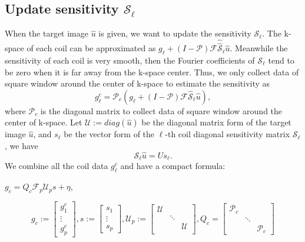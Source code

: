 \documentclass[preprint]{elsarticle}
\begin{document}
\subsection{Update sensitivity $\mathcal{S}_{\ell}$}
When the target image $\hat{u}$ is given, we want to update the sensitivity $\mathcal{S}_{\ell}$.
The k-space of each coil can be approximated as $ g_{\ell} + (I- \mathcal{P}) \mathcal{F}\mathcal{\hat{\hat{S}}}_{\ell}\hat{u}$.
Meanwhile the sensitivity of each coil is very smooth, then the Fourier coefficients of $\mathcal{S}_\ell$ tend to be zero when it is  far away from the k-space center.
Thus, we only collect data of square window around the center of k-space to estimate the sensitivity as
\begin{equation}\label{mod:SENSE-ObsModel_Sensitivity}
 g_{\ell}^c = \mathcal{P}_c(g_{\ell} + (I- \mathcal{P}) \mathcal{F}\mathcal{\hat{S}}_{\ell}\hat{u}),
\end{equation}
where $\mathcal{P}_c$ is the diagonal matrix to collect data of square window around the center of k-space.
Let $\mathcal{U} := diag(\hat{u})$ be the diagonal matrix form of the target image $\hat{u}$, and $s_{\ell}$ be the vector form of the $\ell$-th coil diagonal sensitivity matrix $\mathcal{S}_\ell$, we have
\begin{equation*}
\mathcal{S}_\ell \hat{u} = U s_{\ell}.
\end{equation*}
We combine all the coil data $g_{\ell}^c$ and have a compact formula:
\begin{center}\label{eq:SENSE-ObsModel_Toget_Cent}
$g_c=Q_{c}\mathcal{F}_p \mathcal{U}_p s +\eta$,
\par\end{center}
$$ g_c:=\left[\begin{array}{c}
g_{1}^c\\
\vdots\\
g_{p}^c
\end{array}\right],
s:=\left[\begin{array}{c}
s_{1}\\
\vdots\\
s_{p}
\end{array}\right],
\mathcal{U}_p:=\left[
  \begin{array}{ccc}
    \mathcal{U} & \: & \: \\
    \: & \ddots & \: \\
    \: & \:  & \mathcal{U} \\
  \end{array}
\right],Q_{c}=\left[\begin{array}{ccc}
 \mathcal{P}_c &  & \\
 & \ddots & \\
 & \ &  \mathcal{P}_c
\end{array}\right]$$
\end{document}
